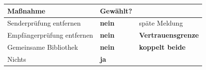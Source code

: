 \begin{technik}
\begin{center}
\renewcommand{\arraystretch}{1.5}
\begin{tabular}{@{}P{3.4cm}P{2.0cm}P{2.4cm}@{}}
\toprule
\textbf{Maßnahme} & \textbf{Gewählt?} & \\
\midrule
Sender\-prüfung entfernen & \textcolor{akzent}{\textbf{nein}} & \textcolor{akzent}{späte Meldung}\\
Empfänger\-prüfung entfernen & \textcolor{akzent}{\textbf{nein}} & \textcolor{akzent}{\textbf{Vertrauens\-grenze}}\\
Gemeinsame Bibliothek & \textcolor{akzent}{\textbf{nein}} & \textcolor{akzent}{\textbf{koppelt beide}}\\
Nichts & \textcolor{gruen}{\textbf{ja}} & \\
\bottomrule
\end{tabular}
\end{center}

\begin{center}
\begin{minipage}{0.86\textwidth}
\end{minipage}
\end{center}
\end{technik}

